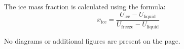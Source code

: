 The ice mass fraction is calculated using the formula:  
\[
x_{\text{ice}} = \frac{U_{\text{ice}} - U_{\text{liquid}}}{U_{\text{freeze}} - U_{\text{liquid}}}
\]  

No diagrams or additional figures are present on the page.